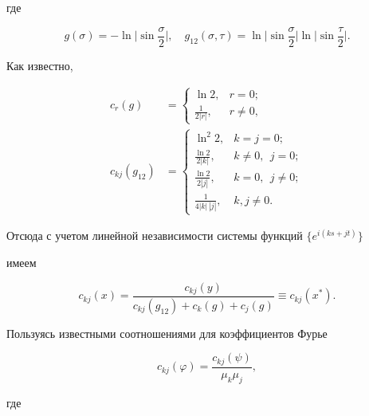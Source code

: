 где  


$$ 


g(\sigma)=-\ln\bigg|\sin\frac{\sigma}{2}\bigg|,\quad 


g_{12}(\sigma,\tau)=\ln\bigg|\sin\frac{\sigma}{2}\bigg| 


\ln\bigg|\sin\frac{\tau}{2}\bigg|. 


$$ 


Как известно, 


\begin{align*} 


c_r(g)&= 


\begin{cases} 


\ln2, & r=0;\\ 


\frac{1}{2|r|}, & r\ne0, 


\end{cases} 


\\ 


c_{kj}(g_{12})&= 


\begin{cases} 


\ln^2 2, & k=j=0;\\ 


\frac{\ln2}{2|k|}, & k\ne0,\ \ j=0;\\ 


\frac{\ln2}{2|j|}, & k=0,\ \ j\ne0;\\ 


\frac{1}{4|k|\,|j|}, & k,j\ne0. 


\end{cases} 


\end{align*} 


Отсюда с учетом линейной независимости системы функций $\{e^{i(ks+jt)}\}$ 


имеем 


$$ 


c_{kj}(x)=\frac{c_{kj}(y)} 


{c_{kj}(g_{12})+c_k(g)+c_j(g)}\equiv c_{kj}(x^*). 


$$ 


Пользуясь известными соотношениями для коэффициентов Фурье 


$$ 


c_{kj}(\varphi)=\frac{c_{kj}(\psi)}{\mu_k\mu_j}, 


$$ 


где 


$$ 


